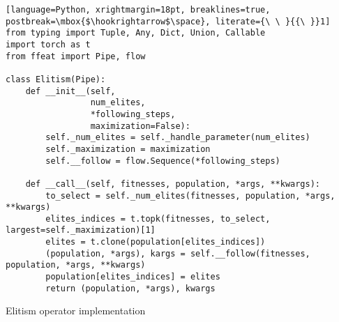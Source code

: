 \begin{algorithm}
\begin{lstlisting}[language=Python, xrightmargin=18pt, breaklines=true, postbreak=\mbox{$\hookrightarrow$\space}, literate={\ \ }{{\ }}1]
from typing import Tuple, Any, Dict, Union, Callable
import torch as t
from ffeat import Pipe, flow

class Elitism(Pipe):
    def __init__(self,
                 num_elites,
                 *following_steps,
                 maximization=False):
        self._num_elites = self._handle_parameter(num_elites)
        self._maximization = maximization
        self.__follow = flow.Sequence(*following_steps)

    def __call__(self, fitnesses, population, *args, **kwargs):
        to_select = self._num_elites(fitnesses, population, *args, **kwargs)
        elites_indices = t.topk(fitnesses, to_select, largest=self._maximization)[1]
        elites = t.clone(population[elites_indices])
        (population, *args), kargs = self.__follow(fitnesses, population, *args, **kwargs)
        population[elites_indices] = elites
        return (population, *args), kwargs
\end{lstlisting}
\caption{Elitism operator implementation}
\label{alg:implelitism}
\end{algorithm}